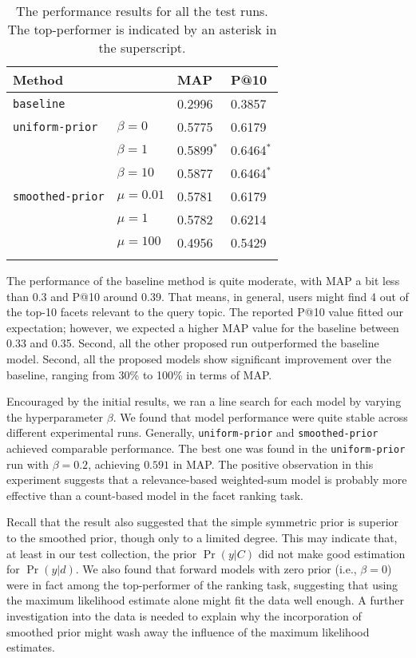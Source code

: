 \begin{table}[ht!]
  \centering
  \begin{tabular}{llll}
    Method & & MAP & P@10 \\
    \hline
    {\tt baseline} & & 0.2996 & 0.3857 \\
    {\tt uniform-prior} & $\beta = 0$ & 0.5775 & 0.6179\\
    & $\beta = 1$ & 0.5899$^*$ & 0.6464$^*$ \\
    & $\beta = 10$ & 0.5877 & 0.6464$^*$ \\
    {\tt smoothed-prior} & $\mu = 0.01$ & 0.5781 & 0.6179 \\
    & $\mu = 1$ & 0.5782 & 0.6214 \\
    & $\mu = 100$ & 0.4956 & 0.5429 \\
    \\
  \end{tabular}
  \caption{The performance results for all the test runs.  The top-performer is indicated by an asterisk in the superscript.}
  \label{t:performance}
\end{table}

The performance of the baseline method is quite moderate, with MAP a bit less
than 0.3 and P@10 around 0.39.  That means, in general, users might find 4 out
of the top-10 facets relevant to the query topic.  The reported P@10 value
fitted our expectation; however, we expected a higher MAP value for the
baseline between 0.33 and 0.35.  Second, all the other proposed run
outperformed the baseline model.  Second, all the proposed models show
significant improvement over the baseline, ranging from 30\% to 100\% in terms
of MAP.  

Encouraged by the initial results, we ran a line search for each model by
varying the hyperparameter $\beta$.  We found that model performance were quite
stable across different experimental runs.  Generally, {\tt uniform-prior}
and {\tt smoothed-prior} achieved comparable performance.  The best
one was found in the {\tt uniform-prior} run with $\beta = 0.2$, achieving
$0.591$ in MAP.  The positive observation in this experiment suggests that a
relevance-based weighted-sum model is probably more effective than a
count-based model in the facet ranking task.  

Recall that the result also suggested that the simple symmetric prior is
superior to the smoothed prior, though only to a limited degree.  This may
indicate that, at least in our test collection, the prior $\Pr(y|C)$ did not
make good estimation for $\Pr(y|d)$.  We also found that forward models with
zero prior (i.e., $\beta = 0$) were in fact among the top-performer of the
ranking task, suggesting that using the maximum likelihood estimate alone might
fit the data well enough.  A further investigation into the data is needed to
explain why the incorporation of smoothed prior might wash away the influence
of the maximum likelihood estimates.

